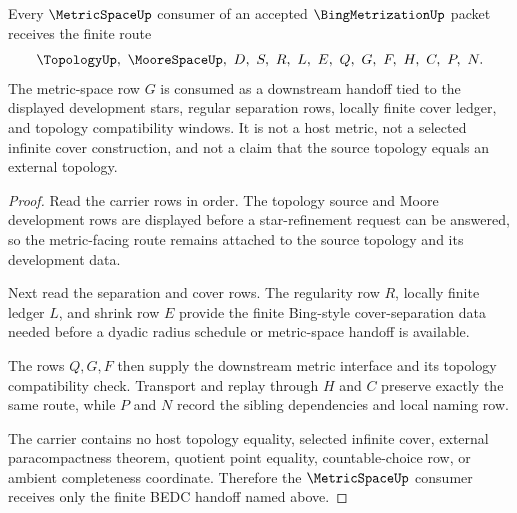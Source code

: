 \begin{theorem}
\label{thm:bing-metrization-metric-handoff}
Every $\MetricSpaceUp$ consumer of an accepted $\BingMetrizationUp$ packet receives the finite route
$$
\TopologyUp,\ \MooreSpaceUp,\ D,\ S,\ R,\ L,\ E,\ Q,\ G,\ F,\ H,\ C,\ P,\ N .
$$
The metric-space row $G$ is consumed as a downstream handoff tied to the displayed development stars, regular separation rows, locally finite cover ledger, and topology compatibility windows. It is not a host metric, not a selected infinite cover construction, and not a claim that the source topology equals an external topology.
\end{theorem}
\begin{proof}
Read the carrier rows in order. The topology source and Moore development rows are displayed before a star-refinement request can be answered, so the metric-facing route remains attached to the source topology and its development data.

Next read the separation and cover rows. The regularity row $R$, locally finite ledger $L$, and shrink row $E$ provide the finite Bing-style cover-separation data needed before a dyadic radius schedule or metric-space handoff is available.

The rows $Q,G,F$ then supply the downstream metric interface and its topology compatibility check. Transport and replay through $H$ and $C$ preserve exactly the same route, while $P$ and $N$ record the sibling dependencies and local naming row.

The carrier contains no host topology equality, selected infinite cover, external paracompactness theorem, quotient point equality, countable-choice row, or ambient completeness coordinate. Therefore the $\MetricSpaceUp$ consumer receives only the finite BEDC handoff named above.
\end{proof}

\begin{closurestatus}{\BingMetrizationUp}
  \theoryclosure{\seedClosure}
  \formalstatus{\unformalizedV}
\end{closurestatus}
